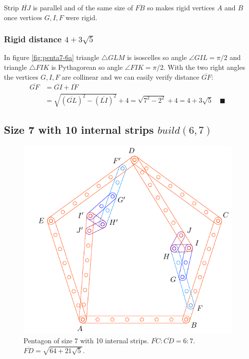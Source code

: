 \documentclass[11pt]{article}
\begin{document}
Strip $\overline{HJ}$ is parallel and of the same size of $\overline{FB}$ so makes rigid vertices $A$ and $B$ once vertices $G,I,F$ were rigid.

\subsubsection{Rigid distance $4 + 3\sqrt5$}

In figure \ref{fig:penta7-6a} triangle $\triangle{GLM}$ is isoscelles so angle $\angle{GIL} = \pi / 2$ and triangle $\triangle{FIK}$ is Pythagorean so angle $\angle{FIK} = \pi / 2$. With the two right angles the vertices $G,I,F$ are collinear and we can easily verify distance $\overline{GF}$:
\begin{align}
\overline{GF} &= \overline{GI} + \overline{IF} \nonumber\\
 &= \sqrt{(\overline{GL})^2 - (\overline{LI})^2} + 4 
 = \sqrt{7^2 - 2^2} + 4 = 4 + 3\sqrt{5} \quad \blacksquare
\end{align}

\subsection{Size 7 with 10 internal strips $build(6,7)$}

\begin{figure}[H]
\centering
\includegraphics[scale=1]{7/penta7-10a}
\caption{Pentagon of size 7 with 10 internal strips. $\overline{FC}:\overline{CD} = 6:7$. $\overline{FD} = \sqrt{64 + 21\sqrt5}$.}
\label{fig:penta7-10a}
\end{figure}
\end{document}
